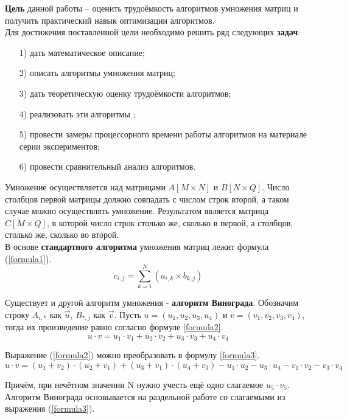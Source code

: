 \textbf{Цель} данной работы – оценить трудоёмкость алгоритмов умножения матриц и получить практический навык оптимизации алгоритмов.\\

Для достижения поставленной цели необходимо решить ряд следующих \textbf{задач}:
\begin{enumerate}
\item[1)] дать математическое описание;
\item[2)] описать алгоритмы умножения матриц;
\item[3)] дать теоретическую оценку трудоёмкости алгоритмов;
\item[4)] реализовать эти алгоритмы ;
\item[5)] провести замеры процессорного времени работы алгоритмов на материале серии экспериментов;
\item[6)] провести сравнительный анализ алгоритмов.
\end{enumerate}

Умножение осуществляется над матрицами $A[M \times N]$ и $B[N \times Q]$. Число столбцов первой матрицы должно совпадать с числом строк второй, а таком случае можно осуществлять умножение. Результатом является матрица $C[M \times Q]$, в которой число строк столько же, сколько в первой, а столбцов, столько же, сколько во второй.\\

В основе \textbf{стандартного алгоритма} умножения матриц лежит формула (\ref{formula1}).
\begin{equation}\label{formula1}
	c_{i,j} = \sum_{k=1}^{N}(a_{i,k} \times b_{k,j})
\end{equation}

Существует и другой алгоритм умножения - \textbf{алгоритм Винограда}.
Обозначим строку $A_{i,*}$ как $\overrightarrow{u}$, $B_{*,j}$ как $\overrightarrow{v}$.
Пусть $u = (u_1, u_2, u_3, u_4)$ и $v = (v_1, v_2, v_3, v_4)$, тогда их произведение равно согласно формуле \ref{formula2}.
\begin{equation}\label{formula2}
u \cdot v = u_1 \cdot v_1 + u_2 \cdot v_2 + u_3 \cdot v_3 + u_4 \cdot v_4
\end{equation}

Выражение (\ref{formula2}) можно преобразовать в формулу \ref{formula3}.
\begin{equation}\label{formula3}
	u \cdot v = (u_1 + v_2)\cdot(u_2 + v_1) + (u_3 + v_1)\cdot(u_4 + v_3) - u_1\cdot u_2 - u_3\cdot u_4 - v_1\cdot v_2 - v_3\cdot v_4
\end{equation}

Причём, при нечётном значении N нужно учесть ещё одно слагаемое $u_5 \cdot v_5$. \\

Алгоритм Винограда основывается на раздельной работе со слагаемыми из выражения (\ref{formula3}). 